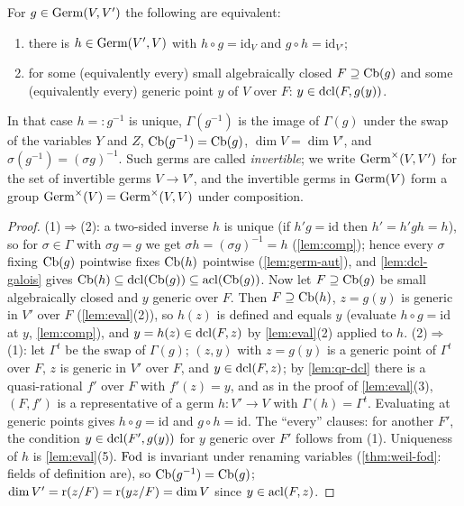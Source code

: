 \begin{lemma}[inverses]\label{lem:inverse}
For $g\in\operatorname{Germ}(V,V')$ the following are equivalent:
\begin{enumerate}[nosep]
\item there is $h\in\operatorname{Germ}(V',V)$ with $h\circ g=\mathrm{id}_V$ and $g\circ h=\mathrm{id}_{V'}$;
\item for some (equivalently every) small algebraically closed $F\supseteq\operatorname{Cb}(g)$ and
  some (equivalently every) generic point $y$ of $V$ over $F$: $y\in\operatorname{dcl}(F,g(y))$.
\end{enumerate}
In that case $h=:g^{-1}$ is unique, $\Gamma(g^{-1})$ is the image of $\Gamma(g)$ under
the swap of the variables $Y$ and $Z$, $\operatorname{Cb}(g^{-1})=\operatorname{Cb}(g)$, $\dim V=\dim V'$, and
$\sigma(g^{-1})=(\sigma g)^{-1}$.  Such germs are called \emph{invertible}; we write
$\operatorname{Germ}^\times(V,V')$ for the set of invertible germs $V\to V'$, and the invertible germs
in $\operatorname{Germ}(V)$ form a group $\operatorname{Germ}^\times(V)=\operatorname{Germ}^\times(V,V)$ under composition.
\end{lemma}
\begin{proof}
(1)$\Rightarrow$(2): a two-sided inverse $h$ is unique (if $h'g=\mathrm{id}$ then
$h'=h'gh=h$), so for $\sigma\in\Gamma$ with $\sigma g=g$ we get $\sigma h=(\sigma g)^{-1}=h$
(\cref{lem:comp}); hence every $\sigma$ fixing $\operatorname{Cb}(g)$ pointwise fixes $\operatorname{Cb}(h)$ pointwise
(\cref{lem:germ-aut}), and \cref{lem:dcl-galois} gives $\operatorname{Cb}(h)\subseteq\operatorname{dcl}(\operatorname{Cb}(g))\subseteq\operatorname{acl}(\operatorname{Cb}(g))$.
Now let $F\supseteq\operatorname{Cb}(g)$ be small algebraically closed and $y$ generic over $F$.  Then
$F\supseteq\operatorname{Cb}(h)$, $z=g(y)$ is generic in $V'$ over $F$ (\cref{lem:eval}(2)), so $h(z)$ is
defined and equals $y$ (evaluate $h\circ g=\mathrm{id}$ at $y$, \cref{lem:comp}), and
$y=h(z)\in\operatorname{dcl}(F,z)$ by \cref{lem:eval}(2) applied to $h$.
(2)$\Rightarrow$(1): let $\Gamma^{t}$ be the swap of $\Gamma(g)$; $(z,y)$ with $z=g(y)$ is a
generic point of $\Gamma^t$ over $F$, $z$ is generic in $V'$ over $F$, and
$y\in\operatorname{dcl}(F,z)$; by \cref{lem:qr-dcl} there is a quasi-rational $f'$ over $F$ with
$f'(z)=y$, and as in the proof of \cref{lem:eval}(3), $(F,f')$ is a representative of a
germ $h:V'\to V$ with $\Gamma(h)=\Gamma^t$.  Evaluating at generic points gives
$h\circ g=\mathrm{id}$ and $g\circ h=\mathrm{id}$.  The ``every'' clauses: for another
$F'$, the condition $y\in\operatorname{dcl}(F',g(y))$ for $y$ generic over $F'$ follows from (1).
Uniqueness of $h$ is \cref{lem:eval}(5).  $\operatorname{Fod}$ is invariant under renaming variables
(\cref{thm:weil-fod}: fields of definition are), so $\operatorname{Cb}(g^{-1})=\operatorname{Cb}(g)$;
$\dim V'=\operatorname{r}(z/F)=\operatorname{r}(yz/F)=\dim V$ since $y\in\operatorname{acl}(F,z)$.
\end{proof}

